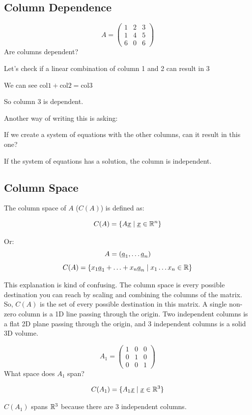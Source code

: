\subsection{Column Dependence} 
\begin{example}
    \[
      A = \begin{pmatrix}
        1 & 2 & 3 \\ 1 & 4 & 5 \\ 6 & 0 & 6
      \end{pmatrix}
    \]
    Are columns dependent? 

    Let's check if a linear combination of column 1 and 2 can result in 3 

    We can see $\text{col}1 + \text{col}2 = \text{col}3$

    So column 3 is dependent. 

    Another way of writing this is asking:

    If we create a system of equations with the other columns, can it result in this one? 

    If the system of equations has a solution, the column is independent. 
\end{example}

\newpage
\subsection{Column Space}
\begin{definition}
    The column space of $A$ ($C(A)$) is defined as: 

    \[
        C(A) = \{A\underline{x} \mid \underline{x} \in \mathbb{R}^n\}
    \]

    Or: 
    \[
        A = (\underline{a}_1, \hdots \underline{a}_n) 
    \]
    \[
        C(A) = \{x_1 \underline{a}_1 + \hdots + x_n \underline{a}_n \mid x_1 \hdots x_n \in \mathbb{R}\}
    \]
\end{definition}

This explanation is kind of confusing. The column space is every possible destination you can reach by scaling and combining the columns of the matrix. So, $C(A)$ is the set of every possible destination in this matrix. A single non-zero column is a 1D line passing through the origin. Two independent columns is a flat 2D plane passing through the origin, and 3 independent columns is a solid 3D volume.

\begin{example}
    \[
        A_1 = \begin{pmatrix}
          1 & 0 & 0 \\ 0 & 1 & 0 \\ 0 & 0 & 1 
        \end{pmatrix}
    \]
    What space does $A_1$ span? 

    \[
        C(A_1) = \{A_1\underline{x} \mid \underline{x} \in \mathbb{R}^3\}
    \]

    $C(A_1)$ spans $\mathbb{R}^3$ because there are 3 independent columns.
    
\end{example}

